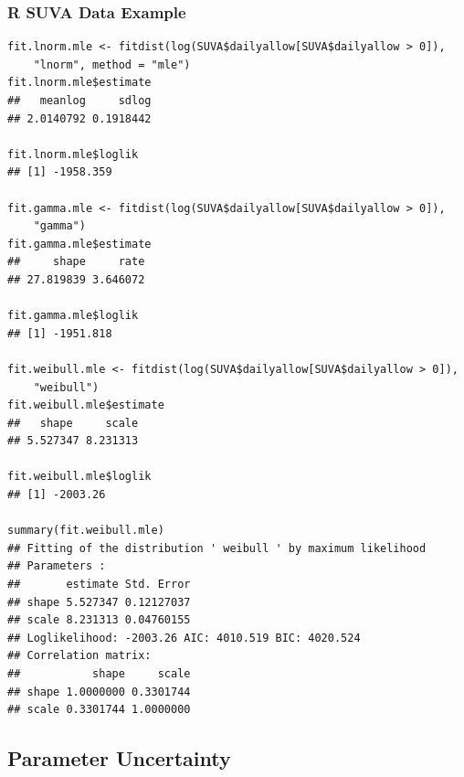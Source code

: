 \documentclass[11pt]{article}
\begin{document}
\subsubsection*{R SUVA Data Example}
\begin{lstlisting}
fit.lnorm.mle <- fitdist(log(SUVA$dailyallow[SUVA$dailyallow > 0]),
    "lnorm", method = "mle")
fit.lnorm.mle$estimate
##   meanlog     sdlog
## 2.0140792 0.1918442

fit.lnorm.mle$loglik
## [1] -1958.359

fit.gamma.mle <- fitdist(log(SUVA$dailyallow[SUVA$dailyallow > 0]),
    "gamma")
fit.gamma.mle$estimate
##     shape     rate
## 27.819839 3.646072

fit.gamma.mle$loglik
## [1] -1951.818

fit.weibull.mle <- fitdist(log(SUVA$dailyallow[SUVA$dailyallow > 0]),
    "weibull")
fit.weibull.mle$estimate
##   shape     scale
## 5.527347 8.231313

fit.weibull.mle$loglik
## [1] -2003.26

summary(fit.weibull.mle)
## Fitting of the distribution ' weibull ' by maximum likelihood
## Parameters :
##       estimate Std. Error
## shape 5.527347 0.12127037
## scale 8.231313 0.04760155
## Loglikelihood: -2003.26 AIC: 4010.519 BIC: 4020.524
## Correlation matrix:
##           shape     scale
## shape 1.0000000 0.3301744
## scale 0.3301744 1.0000000
\end{lstlisting}

\subsection{Parameter Uncertainty}
\end{document}
